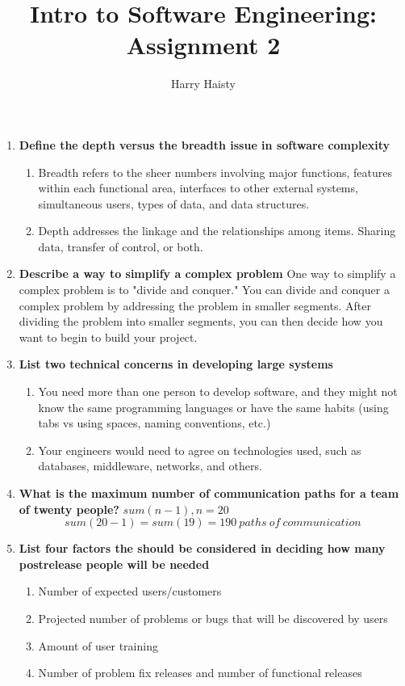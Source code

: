 \documentclass[11pt]{article}
\title{Intro to Software Engineering: Assignment 2}
\author{Harry Haisty}
\begin{document}
\maketitle

\begin{enumerate}
\item\textbf{Define the depth versus the breadth issue in software complexity}

\begin{enumerate}
\item  Breadth refers to the sheer numbers involving major functions, features within each functional area, interfaces to other external systems, simultaneous users, types of data, and data structures. 

\item Depth addresses the linkage and the relationships among items. Sharing data, transfer of control, or both. 
\end{enumerate}

\item \textbf{Describe a way to simplify a complex problem}
\newline 
One way to simplify a complex problem is to "divide and conquer." You can divide and conquer a complex problem by addressing the problem in smaller segments. After dividing the problem into smaller segments, you can then decide how you want to begin to build your project. 
\newline

\item \textbf{List two technical concerns in developing large systems}
\begin{enumerate}
\item You need more than one person to develop software, and they might not know the same programming languages or have the same habits (using tabs vs using spaces, naming conventions, etc.)
\item Your engineers would need to agree on technologies used, such as databases, middleware, networks, and others. 
\end{enumerate}

\item \textbf{What is the maximum number of communication paths for a team of twenty people?}
\newline
\(sum(n-1), n = 20\)
\[sum(20-1) = sum(19) = 190 \ paths\ of \ communication\]

\item \textbf{List four factors the should be considered in deciding how many postrelease people will be needed}
\begin{enumerate}
\item Number of expected users/customers
\item Projected number of problems or bugs that will be discovered by users
\item Amount of user training
\item Number of problem fix releases and number of functional releases
\end{enumerate}

\end{enumerate}
\end{document}
